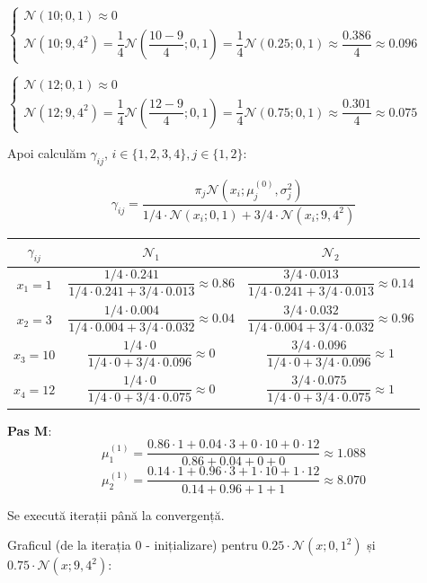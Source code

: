 \documentclass[12pt]{article}
\begin{document}
\begin{enumerate}
\begin{enumerate}
			$\begin{cases}
			\mathcal{N}(10;0,1) \approx 0\\
			\mathcal{N}(10;9,4^2) = \dfrac{1}{4} \mathcal{N}\left(\dfrac{10-9}{4};0,1\right) = \dfrac{1}{4} \mathcal{N}\left(0.25;0,1\right) \approx \dfrac{0.386}{4} \approx 0.096
			\end{cases}$
		
			$\begin{cases}
			\mathcal{N}(12;0,1) \approx 0\\
			\mathcal{N}(12;9,4^2) = \dfrac{1}{4} \mathcal{N}\left(\dfrac{12-9}{4};0,1\right) = \dfrac{1}{4} \mathcal{N}\left(0.75;0,1\right) \approx \dfrac{0.301}{4} \approx 0.075
			\end{cases}$
		
			Apoi calculăm $\gamma_{ij}$, $i\in\{1,2,3,4\}, j \in \{1,2\}$:
			
			$$\gamma_{ij} = \frac{\pi_j  \mathcal{N}(x_i;\mu^{(0)}_j,\sigma_j^2)}{ 1/4 \cdot \mathcal{N}(x_i;0,1) + 3/4 \cdot \mathcal{N}(x_i;9,4^2) }$$
			
			\begin{tabular}{ |c|c|c| } 
				\hline
				$\gamma_{ij}$ & $\mathcal{N}_1$ & $\mathcal{N}_2$ \\ 
				\hline
				$x_1 = 1$ & $\dfrac{1/4 \cdot 0.241}{1/4 \cdot 0.241 + 3/4 \cdot 0.013} \approx 0.86$ & $\dfrac{3/4 \cdot 0.013}{1/4 \cdot 0.241 + 3/4 \cdot 0.013} \approx 0.14$ \\
				$x_2 = 3$ & $\dfrac{1/4 \cdot 0.004}{1/4 \cdot 0.004 + 3/4 \cdot 0.032} \approx 0.04$ & $\dfrac{3/4 \cdot 0.032}{1/4 \cdot 0.004 + 3/4 \cdot 0.032} \approx 0.96$ \\
				$x_3 = 10$ & $\dfrac{1/4 \cdot 0}{1/4 \cdot 0 + 3/4 \cdot 0.096} \approx 0$ & $\dfrac{3/4 \cdot 0.096}{1/4 \cdot 0 + 3/4 \cdot 0.096} \approx 1$ \\
				$x_4 = 12$ &$\dfrac{1/4 \cdot 0}{1/4 \cdot 0 + 3/4 \cdot 0.075} \approx 0$ & $\dfrac{3/4 \cdot 0.075}{1/4 \cdot 0 + 3/4 \cdot 0.075} \approx 1$ \\
				\hline
			\end{tabular}

			\textbf{Pas M}:
			$$\mu_1^{(1)} = \frac{0.86 \cdot 1 + 0.04 \cdot 3 + 0 \cdot 10 + 0 \cdot 12}{0.86 + 0.04 + 0 + 0} \approx 1.088$$
			$$\mu_2^{(1)} = \frac{0.14 \cdot 1 + 0.96 \cdot 3 +1 \cdot 10 + 1 \cdot 12}{0.14 + 0.96 + 1 + 1} \approx 8.070$$
			
			Se execută iterații până la convergență.
			
			Graficul (de la iterația 0 - inițializare) pentru $0.25 \cdot \mathcal{N}(x;0,1^2)$ și $0.75 \cdot \mathcal{N}(x;9,4^2)$:
			

\end{enumerate}
\end{enumerate}
\end{document}
